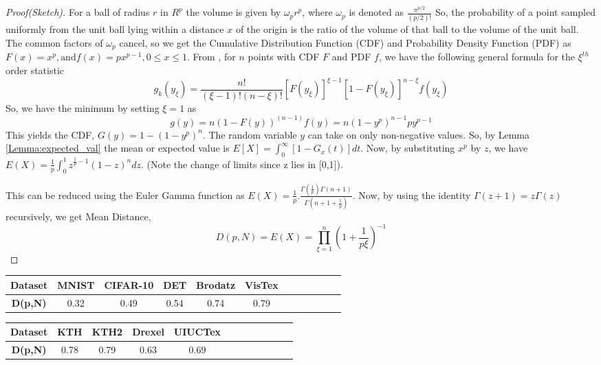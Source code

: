 \documentclass[11pt,a4paper]{article}
\begin{document}
\begin{proof}[Proof(Sketch)] For a ball of radius $r$ in $R^p$ the volume is given by $\omega_pr^p$, where $\omega_p$ is denoted as $\frac{\pi^{p/2}}{(p/2)!}$
So, the probability of a point sampled uniformly from the unit ball lying within a distance $x$ of the origin is the ratio of the volume of that ball to the volume of the unit ball. The common factors of ${\omega}_p$ cancel, so we get the Cumulative Distribution Function (CDF) and Probability Density Function (PDF) as 
$F(x)=x^p, \text{and} f(x)=px^{p-1},  0 \leq x \leq 1$.
From \cite{Hogg2005}, for $n$ points with CDF $F$ and PDF $f$, we have the following general formula for the $\xi^{th}$ order statistic
\begin{equation}\label{Eq:hogg}
g_k(y_\xi) = \frac{n!}{(\xi-1)!(n-\xi)!}[F(y_\xi)]^{\xi-1}[1-F(y_\xi)]^{n-\xi}f(y_\xi)
\end{equation}
So, we have the minimum by setting $\xi=1$ as
\begin{equation}
g(y)=n(1-F(y))^{(n-1)}f(y) = n(1-y^p)^{n-1}py^{p-1}
\end{equation}
This yields the CDF, $G(y)=1-(1-y^p)^n$.
The random variable $y$ can take on only non-negative values. So, by Lemma \ref{Lemma:expected_val} the mean or expected value is $E[X]=\int_0^\infty [1-G_x(t)]dt$.
Now, by substituting $x^p$ by $z$, we have 
$E(X) = \frac{1}{p} \int_0^1 z^{\frac{1}{p}-1}{(1-z)}^n dz $. (Note the change of 
limits since z lies in [0,1]).

This can be reduced using the Euler Gamma function as $E(X) = \frac{1}{p}.\frac{\Gamma(\frac{1}{p})\Gamma(n+1)}{\Gamma(n+1+\frac{1}{p})}$.
Now, by using the identity $\Gamma(z+1) = z\Gamma(z)$ recursively, we get Mean Distance,
\begin{equation}
D(p,N) = E(X) = \prod_{\xi=1}^n (1 + \frac{1}{p\xi})^{-1}
\end{equation}
\end{proof}

\begin{table*}[ht!]
\centering
\begin{tabular}{ | c | c | c | c | c | c | c | c |c | c | c | c |}
    \hline
 \textbf{Dataset} & \textbf{MNIST} & \textbf{CIFAR-10} & \textbf{DET} & \textbf{Brodatz} & \textbf{VisTex} \\  \hline
  \textbf{D(p,N)}  & 0.32 & 0.49 & 0.54 & 0.74 & 0.79 \\  \hline
  \end{tabular}
 
 \begin{tabular}{ | c | c | c | c | c | c | c | c |c | c | c | c |}
    \hline
 \textbf{Dataset} & \textbf{KTH} & \textbf{KTH2} & \textbf{Drexel} & \textbf{UIUCTex}\\  \hline
  \textbf{D(p,N)} & 0.78 & 0.79 & 0.63 & 0.69\\  \hline
  \end{tabular}
   
  \caption{Mean distance from origin to nearest sampling point for various object recognition and texture datasets}
  \label{table:mean_distance_to_closest_point}
\end{table*}
\end{document}
